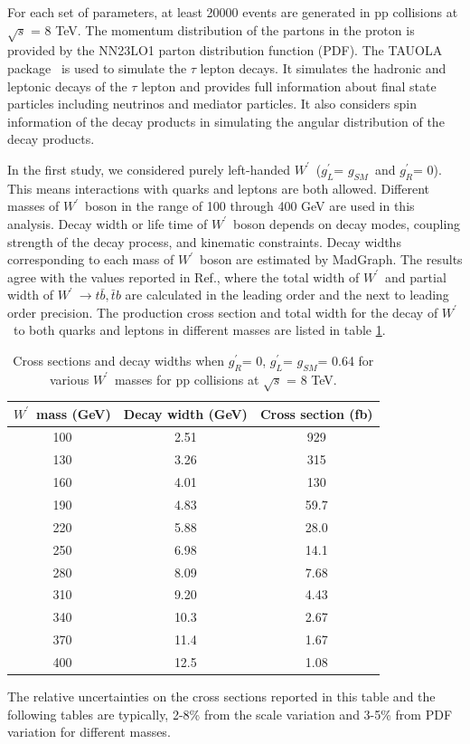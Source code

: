 \documentclass[preprint,showpacs,preprintnumbers]{revtex4}
\newcommand{\wprime}{\ensuremath{W^\prime}~}
\newcommand{\gR}{\ensuremath{g^\prime_R}}
\newcommand{\gL}{\ensuremath{g^\prime_L}}
\newcommand{\gSM}{\ensuremath{g_{\scriptscriptstyle SM}}}
\begin{document}
For each set of parameters, at least 20000 events are generated in pp collisions at $\sqrt{s}$ = 8 TeV. 
The momentum distribution of the partons in the proton is provided by the NN23LO1 \cite{Ball:2013hta} parton distribution function (PDF). The TAUOLA package~\cite{Davidson:2010rw} is used to simulate the $\tau$ lepton decays. It simulates the hadronic and leptonic decays of the $\tau$ lepton and provides full information about final state particles including neutrinos and mediator particles. It also considers spin information of the decay products in simulating the angular distribution of the decay products.

In the first study, we considered purely left-handed  \wprime (\gL = \gSM ~and \gR  = 0). 
This means interactions with quarks and leptons are both allowed. Different masses of  \wprime boson in the range of 100 through 400 GeV are used in this analysis.  
Decay width or life time of \wprime boson depends on decay modes, coupling strength of the decay process, and kinematic constraints. Decay widths corresponding to each mass of \wprime boson are estimated  by MadGraph. The results agree with the values reported in Ref.\cite{Sullivan:2002jt}, where the total width of \wprime and partial width of $\wprime \rightarrow t \bar{b},\bar{t}b $ are calculated in the leading order and the next to leading order precision.
The production cross section and total width for the decay of \wprime  to both quarks and leptons in different masses are listed in table \ref{tab:Xsec,L-h}. 
\begin{table}[htb]
	\centering
	\caption{Cross sections and decay widths when \gR = 0, \gL = \gSM = 0.64  for various \wprime masses for pp collisions at $\sqrt{s}$ = 8 TeV. \label{tab:Xsec,L-h} }
	\begin{tabular}{|c|c|c|}
		\hline 
		\wprime mass (GeV)  &  Decay width (GeV)  &  Cross section (fb)\\
		\hline 
		100 & 2.51 & 929 \\
		130 & 3.26 & 315 \\
		160 & 4.01 & 130 \\
		190 & 4.83 & 59.7 \\
		220 & 5.88 & 28.0 \\
		250 & 6.98 & 14.1 \\
		280 & 8.09 & 7.68 \\
		310 & 9.20 & 4.43 \\
		340 & 10.3 & 2.67 \\
		370 & 11.4 & 1.67 \\ 
		400 & 12.5 & 1.08 \\
		\hline
	\end{tabular}
\end{table}
The relative uncertainties on the cross sections reported in this table and the following tables are typically, 2-8\% from the scale variation and 3-5\% from PDF variation for different masses.
\end{document}
